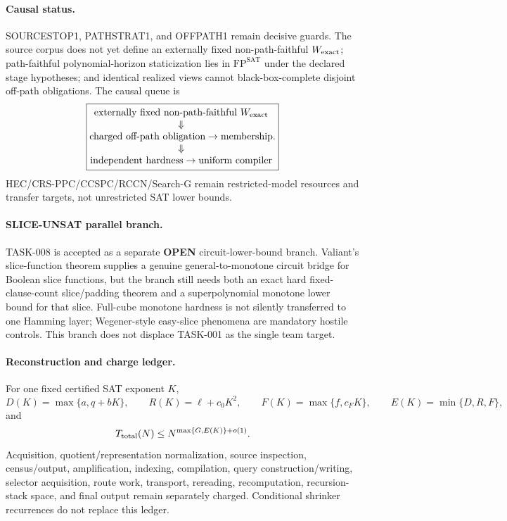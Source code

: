 \documentclass[11pt]{article}
\begin{document}
\paragraph{Causal status.}
SOURCESTOP1, PATHSTRAT1, and OFFPATH1 remain decisive guards. The source corpus does not yet
define an externally fixed non-path-faithful \(W_{\rm exact}\); path-faithful polynomial-horizon
staticization lies in \(\mathrm{FP}^{\mathrm{SAT}}\) under the declared stage hypotheses; and
identical realized views cannot black-box-complete disjoint off-path obligations. The causal queue is
\[
\boxed{
\begin{gathered}
\text{externally fixed non-path-faithful }W_{\rm exact}
\\[-1mm]\Downarrow\\[-1mm]
\text{charged off-path obligation}\to\text{membership}
\\[-1mm]\Downarrow\\[-1mm]
\text{independent hardness}\to\text{uniform compiler}
\end{gathered}.}
\]
HEC/CRS-PPC/CCSPC/RCCN/Search-G remain restricted-model resources and transfer targets,
not unrestricted SAT lower bounds.

\paragraph{SLICE-UNSAT parallel branch.}
TASK-008 is accepted as a separate \textbf{OPEN} circuit-lower-bound branch. Valiant's
slice-function theorem supplies a genuine general-to-monotone circuit bridge for Boolean slice
functions, but the branch still needs both an exact hard fixed-clause-count slice/padding theorem
and a superpolynomial monotone lower bound for that slice. Full-cube monotone hardness is not
silently transferred to one Hamming layer; Wegener-style easy-slice phenomena are mandatory
hostile controls. This branch does not displace TASK-001 as the single team target.

\paragraph{Reconstruction and charge ledger.}
For one fixed certified SAT exponent \(K\),
\[
D(K)=\max\{a,q+bK\},\qquad
R(K)=\ell+c_0K^2,\qquad
F(K)=\max\{f,c_FK\},\qquad
E(K)=\min\{D,R,F\},
\]
and
\[
T_{\rm total}(N)\le N^{\max\{G,E(K)\}+o(1)}.
\]
Acquisition, quotient/representation normalization, source inspection, census/output,
amplification, indexing, compilation, query construction/writing, selector acquisition,
route work, transport, rereading, recomputation, recursion-stack space, and final output
remain separately charged. Conditional shrinker recurrences do not replace this ledger.
\end{document}
